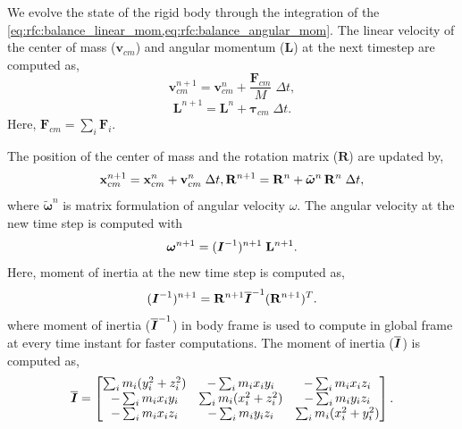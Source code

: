 \documentclass[preprint,12pt]{elsarticle}
\newcommand{\teng}[1]{\ensuremath{\boldsymbol{#1}}}
\newcommand{\ten}[1]{\ensuremath{\mathbf{#1}}}
\begin{document}
We evolve the state of the rigid body through the integration of the
\cref{eq:rfc:balance_linear_mom,eq:rfc:balance_angular_mom}. The linear velocity of the
center of mass ($\ten{v}_{cm}$) and angular momentum ($\ten{L}$) at the next
timestep are computed as,
\begin{equation}
  \label{eq:rfc:lin_vel_cm_update}
  \ten{v}_{cm}^{n+1} = \ten{v}_{cm}^{n} + \frac{\ten{F}_{cm}}{M} \; \Delta t,
\end{equation}
\begin{equation}
  \label{eq:rfc:ang_mom_update}
  \ten{L}^{n+1} = \ten{L}^{n} + \teng{\tau}_{cm} \; \Delta t.
\end{equation}
Here, $\ten{F}_{cm} = \sum_i \ten{F}_i$.

The position of the center of mass and the rotation matrix ($\ten{R}$) are updated
by,
\begin{equation}
  \label{eq:rfc:lin_pos_cm_update}
  \ten{x}_{cm}^{n+1} = \ten{x}_{cm}^{n} + \ten{v}_{cm}^{n} \; \Delta t,\\
  \ten{R}^{n+1} = \ten{R}^{n} + \tilde{\teng{\omega}}^{n} \, \ten{R}^{n} \; \Delta t,
\end{equation}
where $\tilde{\teng{\omega}}^{n}$ is matrix formulation of angular velocity
$\omega$. The angular velocity at the new time step is computed with
\begin{equation}
  \label{eq:rfc:ang_velocity_update}
  \teng{\omega}^{n+1} = (\textit{\teng{I}}^{-1})^{n+1} \; \ten{L}^{n+1}.
\end{equation}
Here, moment of inertia at the new time step is computed as,
\begin{equation}
  \label{eq:rfc:moi_update}
  (\textit{\teng{I}}^{-1})^{n+1} = \ten{R}^{n+1} \textit{\teng{\overline{I}}}^{-1} (\ten{R}^{n+1})^T.
\end{equation}
where moment of inertia ($\textit{\teng{\overline{I}}}^{-1}$) in body frame is
used to compute in global frame at every time instant for faster computations.
The moment of inertia ($\textit{\teng{\overline{I}}}$) is computed as,
\begin{equation*}
\textit{\teng{\overline{I}}} =
\begin{bmatrix}
\sum_i m_i (y_i^2 + z_i^2) & -\sum_i m_i x_iy_i & -\sum_i m_i x_iz_i\\
-\sum_i m_i x_iy_i & \sum_i m_i (x_i^2 + z_i^2) &  -\sum_i m_i y_iz_i\\
-\sum_i m_i  x_iz_i & -\sum_i m_i y_iz_i & \sum_i m_i (x_i^2 + y_i^2)
\end{bmatrix}.
\end{equation*}
\end{document}
